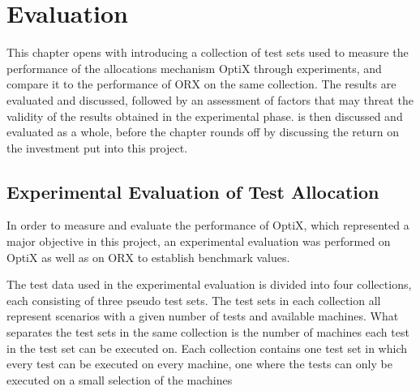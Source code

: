 \section{Evaluation}\label{chapter.discussion}
\thispagestyle{plain}

This chapter opens with introducing a collection of test sets used to measure the performance of the allocations mechanism OptiX through experiments, and compare it to the performance of ORX on the same collection. The results are evaluated and discussed, followed by an assessment of factors that may threat the validity of the results obtained in the experimental phase. \toolname \space is then discussed and evaluated as a whole, before the chapter rounds off by discussing the return on the investment put into this project.


\subsection{Experimental Evaluation of Test Allocation}

In order to measure and evaluate the performance of OptiX, which represented a major objective in this project, an experimental evaluation was performed on OptiX as well as on ORX to establish benchmark values.

The test data used in the experimental evaluation is divided into four collections, each consisting of three pseudo test sets. The test sets in each collection all represent scenarios with a given number of tests and available machines. What separates the test sets in the same collection is the number of machines each test in the test set can be executed on. Each collection contains one test set in which every test can be executed on every machine, one where the tests can only be executed on a small selection of the machines 

